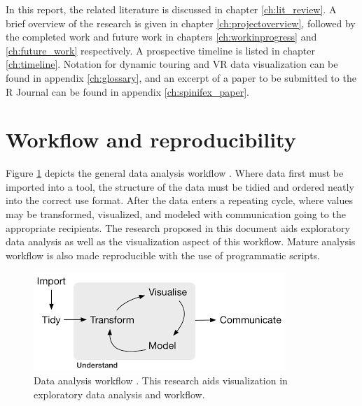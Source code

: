 \documentclass{monashthesis}
\begin{document}
In this report, the related literature is discussed in chapter
\ref{ch:lit_review}. A brief overview of the research is given in
chapter \ref{ch:projectoverview}, followed by the completed work and
future work in chapters \ref{ch:workinprogress} and \ref{ch:future_work}
respectively. A prospective timeline is listed in chapter
\ref{ch:timeline}. Notation for dynamic touring and VR data
visualization can be found in appendix \ref{ch:glossary}, and an excerpt
of a paper to be submitted to the R Journal can be found in appendix
\ref{ch:spinifex_paper}.

\section{Workflow and
reproducibility}\label{workflow-and-reproducibility}

Figure \ref{fig:dataanalysisworkflow} depicts the general data analysis
workflow \autocite{wickham_r_2016}. Where data first must be imported
into a tool, the structure of the data must be tidied and ordered neatly
into the correct use format. After the data enters a repeating cycle,
where values may be transformed, visualized, and modeled with
communication going to the appropriate recipients. The research proposed
in this document aids exploratory data analysis as well as the
visualization aspect of this workflow. Mature analysis workflow is also
made reproducible with the use of programmatic scripts.





\begin{figure}

{\centering \includegraphics[width=1\linewidth]{./figures/data_analysis_workflow} 

}

\caption{Data analysis workflow
\autocite{wickham_r_2016}. This research aids visualization in
exploratory data analysis and workflow.}\label{fig:dataanalysisworkflow}
\end{figure}
\end{document}
